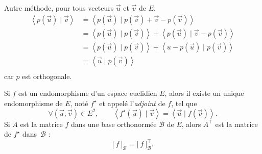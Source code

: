\begin{exo}
\begin{enumerate}
\begin{description}
					Autre méthode, pour tous vecteurs $\vec{u}$\/ et $\vec{v}$\/ de $E$,
					\begin{align*}
						\left<p(\vec{u})  \mid \vec{v} \right>
						&= \left<p(\vec{u})  \mid p(\vec{v}) + \vec{v} - p(\vec{v}) \right> \\
						&= \left< p(\vec{u})  \mid p(\vec{v}) \right> + \left<p(\vec{u})  \mid  \vec{v} - p(\vec{v}) \right> \\
						&= \left<p(\vec{u}) \mid p(\vec{v}) \right> + \left<u - p(\vec{u})  \mid p(\vec{v}) \right> \\
						&= \left<\vec{u}  \mid p(\vec{v}) \right> \\
					\end{align*}
					car $p$\/ est orthogonale.
			\end{description}
	\end{enumerate}
\end{exo}


\begin{prop-defn}
	Si $f$\/ est un endomorphisme d'un espace euclidien $E$, alors il existe un unique endomorphisme de $E$, noté $f^\star$\/ et appelé l'\textit{adjoint} de $f$, tel que \[
		\forall (\vec{u},\vec{v}) \in E^2,\quad\quad \left<f^\star(\vec{u})  \mid \vec{v} \right> =  \left<\vec{u}  \mid f(\vec{v}) \right>
	.\] 
	Si $A$\/ est la matrice $f$\/ dans une base orthonormée $\mathcal{B}$\/ de $E$, alors $A^\top$\/ est la matrice de $f^\star$\/ dans~$\mathcal{B}$\/ : \[
		\big[\:f\:\big]_\mathcal{B} = \big[\:f\:\big]_\mathcal{B}^\top
	.\]
\end{prop-defn}

